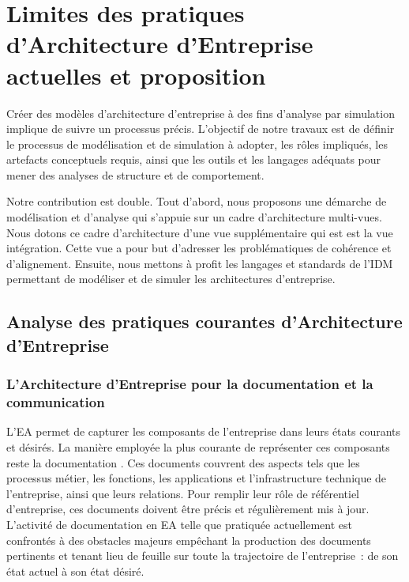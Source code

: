 \chapter{Limites des pratiques d'Architecture d'Entreprise actuelles et 
proposition}
\label{ch:demarche}

\PartialToc

Créer des modèles d'architecture d'entreprise à des fins d'analyse par 
simulation implique de suivre un processus précis. L'objectif de notre travaux 
est de définir le processus de modélisation et de simulation à adopter, les 
rôles impliqués, les artefacts conceptuels requis, ainsi que les outils et les 
langages adéquats pour mener des analyses de structure et de comportement. 

Notre contribution est double. Tout d'abord, nous proposons une démarche de 
modélisation et d'analyse qui s'appuie sur un cadre d'architecture multi-vues. 
Nous dotons ce cadre d'architecture d'une vue supplémentaire qui est est la vue 
intégration. Cette vue a pour but d'adresser les problématiques de cohérence et 
d'alignement. Ensuite, nous mettons à profit les langages et standards de l'IDM 
permettant de modéliser et de simuler les architectures d'entreprise. 



\section{Analyse des pratiques courantes d'Architecture d'Entreprise}

	\subsection{L'Architecture d'Entreprise pour la documentation et la 
communication}
	L'EA permet de capturer les composants de l'entreprise dans leurs états 
courants et désirés. La manière employée la plus courante de représenter ces 
composants reste la documentation \cite{barn2013enterprise}. Ces documents 
couvrent des aspects tels que les processus métier, les fonctions, les 
applications et l'infrastructure technique de l'entreprise, ainsi que leurs 
relations. Pour remplir leur rôle de référentiel d'entreprise, ces documents 
doivent être précis et régulièrement mis à jour. L'activité de documentation en 
EA telle que pratiquée actuellement est confrontés à des obstacles majeurs 
empêchant la production des documents pertinents et tenant lieu de feuille sur 
toute la trajectoire de l'entreprise~: de son état actuel à son état désiré.
	
